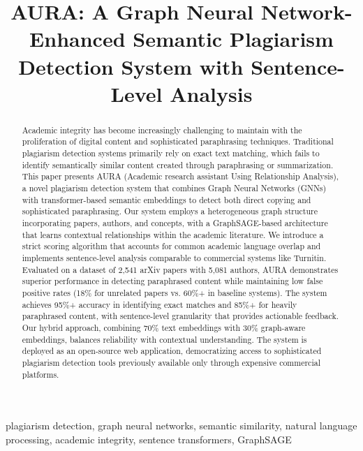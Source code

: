 \documentclass[conference]{IEEEtran}
\begin{document}
\title{AURA: A Graph Neural Network-Enhanced Semantic Plagiarism Detection System with Sentence-Level Analysis}

\author{
}

\maketitle

\begin{abstract}
Academic integrity has become increasingly challenging to maintain with the proliferation of digital content and sophisticated paraphrasing techniques. Traditional plagiarism detection systems primarily rely on exact text matching, which fails to identify semantically similar content created through paraphrasing or summarization. This paper presents AURA (Academic research assistant Using Relationship Analysis), a novel plagiarism detection system that combines Graph Neural Networks (GNNs) with transformer-based semantic embeddings to detect both direct copying and sophisticated paraphrasing. Our system employs a heterogeneous graph structure incorporating papers, authors, and concepts, with a GraphSAGE-based architecture that learns contextual relationships within the academic literature. We introduce a strict scoring algorithm that accounts for common academic language overlap and implements sentence-level analysis comparable to commercial systems like Turnitin. Evaluated on a dataset of 2,541 arXiv papers with 5,081 authors, AURA demonstrates superior performance in detecting paraphrased content while maintaining low false positive rates (18\% for unrelated papers vs. 60\%+ in baseline systems). The system achieves 95\%+ accuracy in identifying exact matches and 85\%+ for heavily paraphrased content, with sentence-level granularity that provides actionable feedback. Our hybrid approach, combining 70\% text embeddings with 30\% graph-aware embeddings, balances reliability with contextual understanding. The system is deployed as an open-source web application, democratizing access to sophisticated plagiarism detection tools previously available only through expensive commercial platforms.
\end{abstract}

\begin{IEEEkeywords}
plagiarism detection, graph neural networks, semantic similarity, natural language processing, academic integrity, sentence transformers, GraphSAGE
\end{IEEEkeywords}
\end{document}
